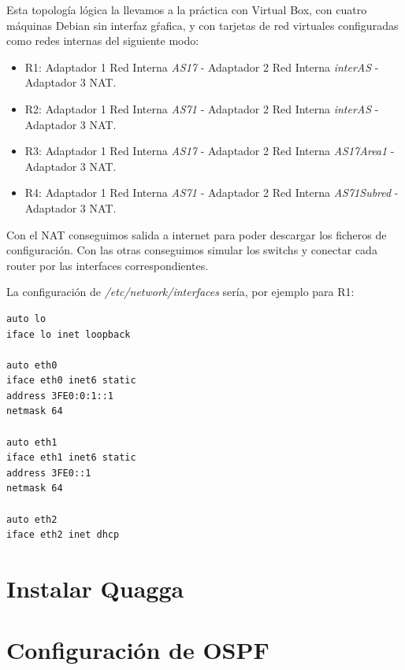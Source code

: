 \documentclass{article}
\begin{document}
\hfill

Esta topología lógica la llevamos a la práctica con Virtual Box, con cuatro máquinas Debian sin interfaz gŕafica, y con tarjetas de red virtuales configuradas como redes internas del siguiente modo:

\begin{itemize}

	\item R1: Adaptador 1 Red Interna \textit{AS17} - Adaptador 2 Red Interna \textit{interAS} - Adaptador 3 NAT.
	
	\item R2: Adaptador 1 Red Interna \textit{AS71} - Adaptador 2 Red Interna \textit{interAS} - Adaptador 3 NAT.
	
	\item R3: Adaptador 1 Red Interna \textit{AS17} - Adaptador 2 Red Interna \textit{AS17Area1} - Adaptador 3 NAT.
	
	\item R4: Adaptador 1 Red Interna \textit{AS71} - Adaptador 2 Red Interna \textit{AS71Subred} - Adaptador 3 NAT.

\end{itemize}

Con el NAT conseguimos salida a internet para poder descargar los ficheros de configuración. Con las otras conseguimos simular los switchs y conectar cada router por las interfaces correspondientes.

La configuración de \textit{/etc/network/interfaces} sería, por ejemplo para R1:

\begin{BVerbatim}
auto lo
iface lo inet loopback

auto eth0
iface eth0 inet6 static
address 3FE0:0:1::1
netmask 64

auto eth1
iface eth1 inet6 static
address 3FE0::1
netmask 64

auto eth2
iface eth2 inet dhcp
\end{BVerbatim}


\section{Instalar Quagga}

\section{Configuración de OSPF}
\end{document}
